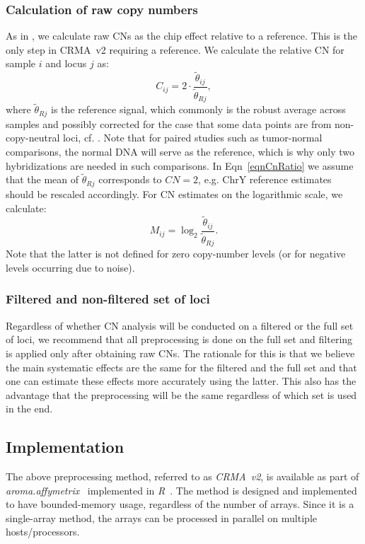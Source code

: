 \documentclass{bioinfo}
\newcommand{\pkg}[1]{\textit{#1}\xspace}
\newcommand{\CN}{CN\xspace}
\begin{document}
\subsubsection{Calculation of raw copy numbers}
\label{secRawCN}
As in \citet{BengtssonH_etal_2008}, we calculate raw CNs as the chip effect relative to a reference.  This is the only step in CRMA~v2 requiring a reference.
We calculate the relative \CN for sample $i$ and locus $j$ as:
\begin{equation}
  C_{ij} = 2 \cdot \frac{\tilde\theta_{ij}}{\tilde\theta_{Rj}},
  \label{eqnCnRatio}
\end{equation}
where $\tilde\theta_{Rj}$ is the reference signal, which commonly is the robust average across samples and possibly corrected for the case that some data points are from non-copy-neutral loci, cf. \citet{BengtssonH_etal_2008}.
Note that for paired studies such as tumor-normal comparisons, the normal DNA will serve as the reference, which is why only two hybridizations are needed in such comparisons.
In Eqn~\eqref{eqnCnRatio} we assume that the mean of $\tilde\theta_{Rj}$ corresponds to $\CN=2$, e.g. ChrY reference estimates should be rescaled accordingly.
For \CN estimates on the logarithmic scale, we calculate:
\begin{equation}
  M_{ij} = \log_2 \frac{\tilde\theta_{ij}}{\tilde\theta_{Rj}}.
  \label{eqnCnLogRatio}
\end{equation}
Note that the latter is not defined for zero copy-number levels (or for negative levels occurring due to noise).


\subsubsection{Filtered and non-filtered set of loci}
Regardless of whether CN analysis will be conducted on a filtered or the full set of loci, we recommend that all preprocessing is done on the full set and filtering is applied only after obtaining raw CNs.  %
The rationale for this is that we believe the main systematic effects are the same for the filtered and the full set and that one can estimate these effects more accurately using the latter.
This also has the advantage that the preprocessing will be the same regardless of which set is used in the end.


\subsection{Implementation}
The above preprocessing method, referred to as \emph{CRMA~v2}, is available as part of \pkg{aroma.affymetrix}~\citep{BengtssonH_etal_2008b} implemented in \pkg{R}~\citep{RDevel_2008}.
The method is designed and implemented to have bounded-memory usage, regardless of the number of arrays.
Since it is a single-array method, the arrays can be processed in parallel on multiple hosts/processors.
\end{document}
